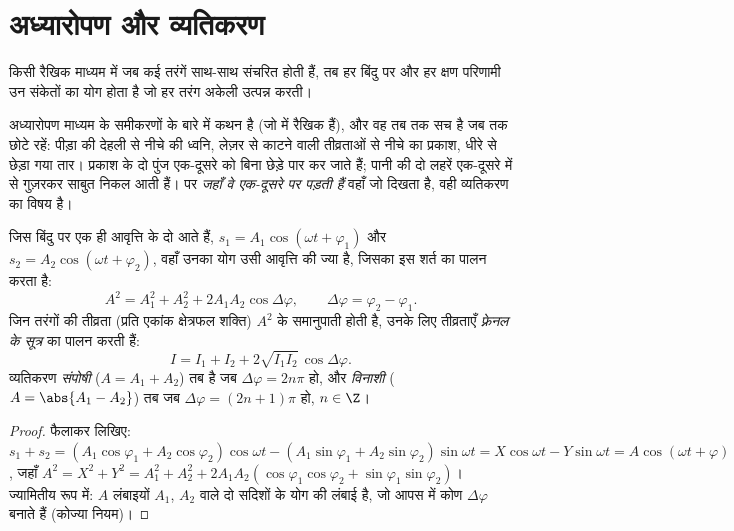 \section{अध्यारोपण और व्यतिकरण}

\begin{theorem}[अध्यारोपण]\label{thm:b1:wave-propagation:superposition}
किसी रैखिक माध्यम में जब कई तरंगें साथ-साथ संचरित होती हैं, तब हर बिंदु पर और
हर क्षण परिणामी  उन संकेतों का योग होता है जो हर तरंग अकेली उत्पन्न
करती।
\end{theorem}
\admitted

\begin{remark}[रैखिकता]\label{rem:b1:wave-propagation:linearity}
अध्यारोपण माध्यम के समीकरणों के बारे में कथन है (जो  में रैखिक हैं), और
वह तब तक सच है जब तक  छोटे रहें: पीड़ा की देहली से नीचे की ध्वनि, लेज़र से
काटने वाली तीव्रताओं से नीचे का प्रकाश, धीरे से छेड़ा गया तार। प्रकाश के दो
पुंज एक-दूसरे को बिना छेड़े पार कर जाते हैं; पानी की दो लहरें एक-दूसरे में से
गुज़रकर साबुत निकल आती हैं। पर \emph{जहाँ वे एक-दूसरे पर पड़ती हैं} वहाँ जो
दिखता है, वही व्यतिकरण का विषय है।
\end{remark}

\begin{theorem}[एक ही आवृत्ति के दो ज्यावक्रीय संकेत]\label{thm:b1:wave-propagation:fresnel}
जिस बिंदु पर एक ही आवृत्ति के दो  आते हैं,
$s_1 = A_1\cos(\omega t + \varphi_1)$ और $s_2 = A_2\cos(\omega t + \varphi_2)$,
वहाँ उनका योग उसी आवृत्ति की ज्या है, जिसका  इस शर्त का पालन करता है:
\[
A^2 = A_1^2 + A_2^2 + 2A_1A_2\cos\Delta\varphi,
\qquad \Delta\varphi = \varphi_2 - \varphi_1 .
\]
जिन तरंगों की तीव्रता (प्रति एकांक क्षेत्रफल शक्ति)
$A^2$ के समानुपाती होती है, उनके लिए तीव्रताएँ \emph{फ़्रेनल के सूत्र} का पालन करती हैं:
\[
I = I_1 + I_2 + 2\sqrt{I_1 I_2}\,\cos\Delta\varphi .
\]
व्यतिकरण \emph{संपोषी} ($A = A_1 + A_2$) तब है जब
$\Delta\varphi = 2n\pi$ हो, और \emph{विनाशी} ($A = \abs{A_1 - A_2}$)
तब जब $\Delta\varphi = (2n + 1)\pi$ हो, $n \in \Z$।
\end{theorem}

\begin{proof}
फैलाकर लिखिए: $s_1 + s_2 = (A_1\cos\varphi_1 + A_2\cos\varphi_2)\cos\omega t -
(A_1\sin\varphi_1 + A_2\sin\varphi_2)\sin\omega t = X\cos\omega t -
Y\sin\omega t = A\cos(\omega t + \varphi)$, जहाँ $A^2 = X^2 + Y^2 =
A_1^2 + A_2^2 + 2A_1A_2(\cos\varphi_1\cos\varphi_2 + \sin\varphi_1\sin\varphi_2)$।
ज्यामितीय रूप में: $A$ लंबाइयों
$A_1$, $A_2$ वाले दो सदिशों के योग की लंबाई है, जो आपस में कोण $\Delta\varphi$ बनाते हैं (कोज्या नियम)।
\end{proof}

